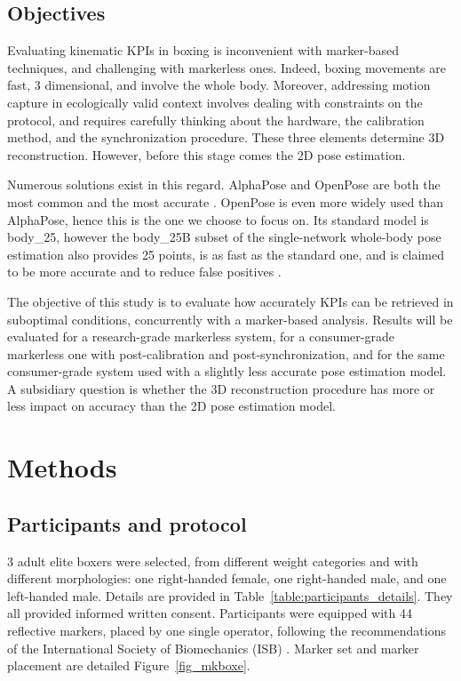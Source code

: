 \subsection{Objectives}

Evaluating kinematic KPIs in boxing is inconvenient with marker-based techniques, and challenging with markerless ones. Indeed, boxing movements are fast, 3 dimensional, and involve the whole body. Moreover, addressing motion capture in ecologically valid context involves dealing with constraints on the protocol, and requires carefully thinking about the hardware, the calibration method, and the synchronization procedure. These three elements determine 3D reconstruction. However, before this stage comes the 2D pose estimation. 

Numerous solutions exist in this regard. AlphaPose \cite{Fang2017} and OpenPose \cite{Cao2019} are both the most common and the most accurate \cite{Needham2021b,Mroz2021}. OpenPose is even more widely used than AlphaPose, hence this is the one we choose to focus on. Its standard model is body\_25, however the body\_25B subset of the single-network whole-body pose estimation \cite{Hidalgo2019} also provides 25 points, is as fast as the standard one, and is claimed to be more accurate and to reduce false positives \cite{Hidalgo2019,Pagnon2021}. 

The objective of this study is to evaluate how accurately KPIs can be retrieved in suboptimal conditions, concurrently with a marker-based analysis. Results will be evaluated for a research-grade markerless system, for a consumer-grade markerless one with post-calibration and post-synchronization, and for the same consumer-grade system used with a slightly less accurate pose estimation model. A subsidiary question is whether the 3D reconstruction procedure has more or less impact on accuracy than the 2D pose estimation model.


\section{Methods}
\subsection{Participants and protocol}
3 adult elite boxers were selected, from different weight categories and with different morphologies: one right-handed female, one right-handed male, and one left-handed male. Details are provided in Table~\ref{table:participants_details}. They all provided informed written consent. Participants were equipped with 44 reflective markers, placed by one single operator, following the recommendations of the International Society of Biomechanics (ISB) \cite{Wu2002, Wu2005}. Marker set and marker placement are detailed Figure~\ref{fig_mkboxe}.

